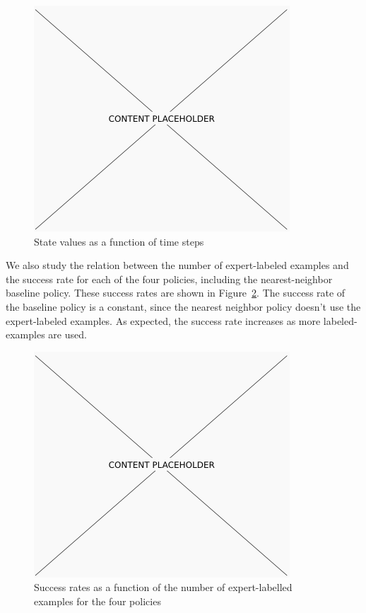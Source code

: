 \begin{figure}[h!]
  \centering
    \includegraphics[width=0.9\linewidth]{figures/placeholder.png}
  \caption{State values as a function of time steps}
  \label{fig:values}
\end{figure}

We also study the relation between the number of expert-labeled examples and the success rate for each of the four policies, including the nearest-neighbor baseline policy.
These success rates are shown in Figure~\ref{fig:number_examples}.
The success rate of the baseline policy is a constant, since the nearest neighbor policy doesn't use the expert-labeled examples.
As expected, the success rate increases as more labeled-examples are used.

\begin{figure}[h!]
  \centering
    \includegraphics[width=0.9\linewidth]{figures/placeholder.png}
  \caption{Success rates as a function of the number of expert-labelled examples for the four policies}
  \label{fig:number_examples}
\end{figure}


